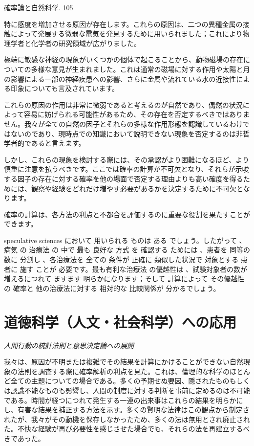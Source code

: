 \documentclass[a4paper,11pt,openany]{ltjsbook}
\begin{document}
確率論と自然科学. 105

特に感度を増加させる原因が存在します。これらの原因は、二つの異種金属の接触によって発展する微弱な電気を発見するために用いられました；これにより物理学者と化学者の研究領域が広がりました。

極端に敏感な神経の現象がいくつかの個体で起こることから、動物磁場の存在についての多様な意見が生まれました。これは通常の磁場に対する作用や太陽と月の影響による一部の神経疾患への影響、さらに金属や流れている水の近接性による印象についても言及されています。

これらの原因の作用は非常に微弱であると考えるのが自然であり、偶然の状況によって容易に妨げられる可能性があるため、その存在を否定するべきではありません。我々が全ての自然の因子とそれらの多様な作用形態を認識しているわけではないのであり、現時点での知識において説明できない現象を否定するのは非哲学者的であると言えます。

しかし、これらの現象を検討する際には、その承認がより困難になるほど、より慎重に注意を払うべきです。ここでは確率の計算が不可欠となり、それらが示唆する因子の存在に対する確率を他の場面で否定する理由よりも高い確度を得るためには、観察や経験をどれだけ増やす必要があるかを決定するために不可欠となります。

確率の計算は、各方法の利点と不都合を評価するのに重要な役割を果たすことができます。

speculative  sciences において 用いられる ものは ある でしょう。したがって 、病気 の 治療法 の 中で 最も 良好な 方式 を 確認する ためには 、患者を 同等の 数に 分割し 、各治療法を 全ての 条件が 正確に 類似した状況で 対象とする 患者に 施す ことが 必要です。最も有利な治療法 の優越性は 、試験対象者の数が 増えるにつれて ますます 明らかになります；そして 計算によって その優越性の 確率と 他の治療法に対する 相対的な 比較関係が 分かるでしょう。

\newpage

\chapter{道徳科学（人文・社会科学）への応用}
\label{ch:x}

\begin{center}
\large\textit{人間行動の統計法則と意思決定論への展開}
\end{center}
\vspace{4mm}

我々は、原因が不明または複雑でその結果を計算にかけることができない自然現象の法則を調査する際に確率解析の利点を見た。これは、倫理的な科学のほとんど全ての主題についての場合である。多くの予期せぬ要因、隠されたものもしくは認識不能なものも影響し、人間の制度に対する判断を事前に定めるのは不可能である。時間が経つにつれて発生する一連の出来事はこれらの結果を明らかにし、有害な結果を補正する方法を示す。多くの賢明な法律はこの観点から制定されたが、我々がその動機を保存しなかったため、多くの法は無用とされ廃止された。不快な経験が再び必要性を感じさせた場合でも、それらの法を再建立するべきであった。
\end{document}
